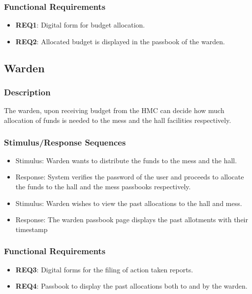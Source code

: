 \documentclass{scrreprt}
\begin{document}
\subsubsection{Functional Requirements}
\begin{itemize}
    \item \textbf{REQ1}: Digital form for budget allocation.
    \item \textbf{REQ2}: Allocated budget is displayed in the passbook of the warden.
\end{itemize}

\subsection{Warden}
\subsubsection{Description}
The warden, upon receiving budget from  the HMC can decide how much allocation of funds is needed to the mess and the hall facilities respectively.
\subsubsection{Stimulus/Response Sequences}
\begin{itemize}
    \item Stimulus: Warden wants to distribute the funds to the mess and the hall.
    \item Response: System verifies the password of the user and proceeds to allocate the funds to the hall and the mess passbooks respectively.
\end{itemize}
\begin{itemize}
    \item Stimulus: Warden wishes to view the past allocations to the hall and mess.
    \item Response: The warden passbook page displays the past allotments with their timestamp
\end{itemize}

\subsubsection{Functional Requirements}
\begin{itemize}
    \item \textbf{REQ3}: Digital forms for the filing of action taken reports.
    \item \textbf{REQ4}: Passbook to display the past allocations both to and by the warden.
\end{itemize}
\end{document}
